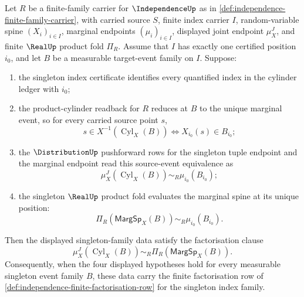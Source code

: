 \begin{theorem}
\label{thm:independence-singleton-index-factorization-row}
Let $R$ be a finite-family carrier for $\IndependenceUp$ as in \autoref{def:independence-finite-family-carrier}, with carried source $S$, finite index carrier $I$, random-variable spine $(X_i)_{i\in I}$, marginal endpoints $(\mu_i)_{i\in I}$, displayed joint endpoint $\mu_X^J$, and finite $\RealUp$ product fold $\Pi_R$. Assume that $I$ has exactly one certified position $i_0$, and let $B$ be a measurable target-event family on $I$. Suppose:
\begin{enumerate}
\item the singleton index certificate identifies every quantified index in the cylinder ledger with $i_0$;
\item the product-cylinder readback for $R$ reduces at $B$ to the unique marginal event, so for every carried source point $s$,
$$
s\in X^{-1}(\operatorname{Cyl}_X(B))
\Longleftrightarrow
X_{i_0}(s)\in B_{i_0};
$$
\item the $\DistributionUp$ pushforward rows for the singleton tuple endpoint and the marginal endpoint read this source-event equivalence as
$$
\mu_X^J(\operatorname{Cyl}_X(B))\sim_R\mu_{i_0}(B_{i_0});
$$
\item the singleton $\RealUp$ product fold evaluates the marginal spine at its unique position:
$$
\Pi_R(\mathsf{MargSp}_X(B))\sim_R\mu_{i_0}(B_{i_0}).
$$
\end{enumerate}
Then the displayed singleton-family data satisfy the factorisation clause
$$
\mu_X^J(\operatorname{Cyl}_X(B))\sim_R\Pi_R(\mathsf{MargSp}_X(B)).
$$
Consequently, when the four displayed hypotheses hold for every measurable singleton event family $B$, these data carry the finite factorisation row of \autoref{def:independence-finite-factorisation-row} for the singleton index family.
\end{theorem}
